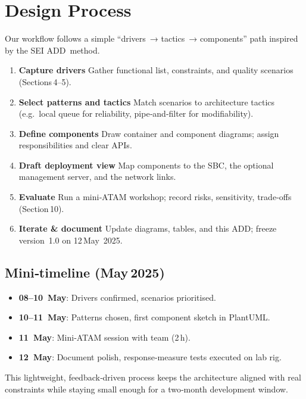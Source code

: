 \documentclass[11pt,a4paper]{article}
\begin{document}
\section{Design Process}

Our workflow follows a simple “drivers → tactics → components” path inspired by the SEI ADD method.

\begin{enumerate}
  \item \textbf{Capture drivers}  
        Gather functional list, constraints, and quality scenarios (Sections 4–5).
  \item \textbf{Select patterns and tactics}  
        Match scenarios to architecture tactics (e.g.\ local queue for reliability, pipe‑and‑filter for modifiability).
  \item \textbf{Define components}  
        Draw container and component diagrams; assign responsibilities and clear APIs.
  \item \textbf{Draft deployment view}  
        Map components to the SBC, the optional management server, and the network links.
  \item \textbf{Evaluate}  
        Run a mini‑ATAM workshop; record risks, sensitivity, trade‑offs (Section 10).
  \item \textbf{Iterate \& document}  
        Update diagrams, tables, and this ADD; freeze version 1.0 on 12 May 2025.
\end{enumerate}

\subsection*{Mini‑timeline (May 2025)}
\begin{itemize}
  \item \textbf{08–10 May}: Drivers confirmed, scenarios prioritised.
  \item \textbf{10–11 May}: Patterns chosen, first component sketch in PlantUML.
  \item \textbf{11 May}: Mini‑ATAM session with team (2 h).
  \item \textbf{12 May}: Document polish, response‑measure tests executed on lab rig.
\end{itemize}

This lightweight, feedback‑driven process keeps the architecture aligned with real constraints while staying small enough for a two‑month development window.
\end{document}

